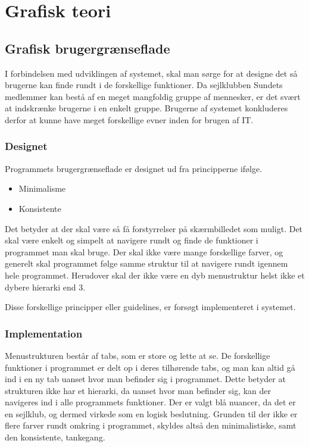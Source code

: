 \chapter{Grafisk teori}
\section{Grafisk brugergrænseflade} \label{chap:GUI}

I forbindelsen med udviklingen af systemet, skal man sørge for at designe det så brugerne kan finde rundt i de forskellige funktioner. Da sejlklubben Sundets medlemmer kan bestå af en meget mangfoldig gruppe af mennesker, er det svært at indskrænke brugerne i en enkelt gruppe. Brugerne af systemet konkluderes derfor at kunne have meget forskellige evner inden for brugen af IT.

\subsection{Designet} \label{sec:Designet}

Programmets brugergrænseflade er designet ud fra principperne ifølge. \citep{gui1} 

\begin{itemize}
	\item Minimalisme
	\item Konsistente
\end{itemize}

Det betyder at der skal være så få forstyrrelser på skærmbilledet som muligt. Det skal være enkelt og simpelt at navigere rundt og finde de funktioner i programmet man skal bruge. Der skal ikke være mange forskellige farver, og generelt skal programmet følge samme struktur til at navigere rundt igennem hele programmet. Herudover skal der ikke være en dyb menustruktur helst ikke et dybere hierarki end 3.

Disse forskellige principper eller guidelines, er forsøgt implementeret i systemet.

\subsection{Implementation}\label{sec:Implementation}

Menustrukturen består af tabs, som er store og lette at se. De forskellige funktioner i programmet er delt op i deres tilhørende tabs, og man kan altid gå ind i en ny tab uanset hvor man befinder sig i programmet. Dette betyder at strukturen ikke har et hierarki, da uanset hvor man befinder sig, kan der navigeres ind i alle programmets funktioner. Der er valgt blå nuancer, da det er en sejlklub, og dermed virkede som en logisk beslutning. Grunden til der ikke er flere farver rundt omkring i programmet, skyldes altså den minimalistiske, samt den konsistente, tankegang.

